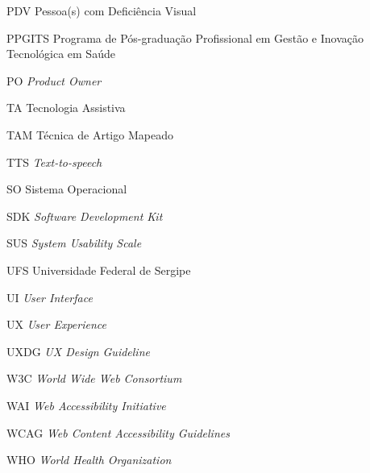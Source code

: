 \begin{siglas}
	\item[PDV]{Pessoa(s) com Deficiência Visual}
	\item[PPGITS]{Programa de Pós-graduação Profissional em Gestão e Inovação Tecnológica em Saúde}
	\item[PO]{\emph{Product Owner}}
	\item[TA]{Tecnologia Assistiva}
	\item[TAM]{Técnica de Artigo Mapeado}
	\item[TTS]{\textit{Text-to-speech}}
	\item[SO]{Sistema Operacional}
	\item[SDK]{\textit{Software Development Kit}}
	\item[SUS]{\textit{System Usability Scale}}
	\item[UFS]{Universidade Federal de Sergipe}
	\item[UI]{\textit{User Interface}}
	\item[UX]{\textit{User Experience}}
	\item[UXDG]{\textit{UX Design Guideline}}
	\item[W3C]{\textit{World Wide Web Consortium}}
	\item[WAI]{\textit{Web Accessibility Initiative}}
	\item[WCAG]{\textit{Web Content Accessibility Guidelines}}
	\item[WHO]{\textit{World Health Organization}}
\end{siglas}